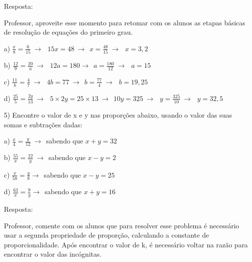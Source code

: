 Resposta:

Professor, aproveite esse momento para retomar com os alunos as etapas
básicas de resolução de equações do primeiro grau.

a)
\(\frac{x}{8} = \frac{6}{15}\  \rightarrow \ \ \ 15x = 48\  \rightarrow \ \ x = \frac{48}{15}\  \rightarrow \ \ \ x = 3,2\)

b)
\(\frac{12}{9} = \frac{20}{a}\  \rightarrow \ \ \ 12a = 180 \rightarrow \ \ a = \frac{180}{12}\  \rightarrow \ \ \ a = 15\)

c)
\(\frac{11}{b} = \frac{4}{7}\  \rightarrow \ \ \ 4b = 77\  \rightarrow \ \ b = \frac{77}{4}\  \rightarrow \ \ \ b = 19,25\)

d)
\(\frac{25}{5} = \frac{2y}{13}\  \rightarrow \ \ \ 5 \times 2y = 25 \times 13\  \rightarrow \ \ 10y = 325\  \rightarrow \ \ \ y = \frac{325}{10}\  \rightarrow \ \ \ y = 32,5\)

5) Encontre o valor de x e y nas proporções abaixo, usando o valor das
suas somas e subtrações dadas:

a) \(\frac{x}{4} = \frac{y}{12}\  \rightarrow \ \ \)sabendo que
\(x + y = 32\)

b) \(\frac{55}{x} = \frac{22}{y}\  \rightarrow \ \ \)sabendo que
\(x - y = 2\)

c) \(\frac{x}{58} = \frac{y}{8} \rightarrow \ \ \)sabendo que
\(x - y = 25\)

d) \(\frac{63}{x} = \frac{9}{y} \rightarrow \ \ \)sabendo que
\(x + y = 16\)

Resposta:

Professor, comente com os alunos que para resolver esse problema é
necessário usar a segunda propriedade de proporção, calculando a
constante de proporcionalidade. Após encontrar o valor de k, é
necessário voltar na razão para encontrar o valor das incógnitas.




